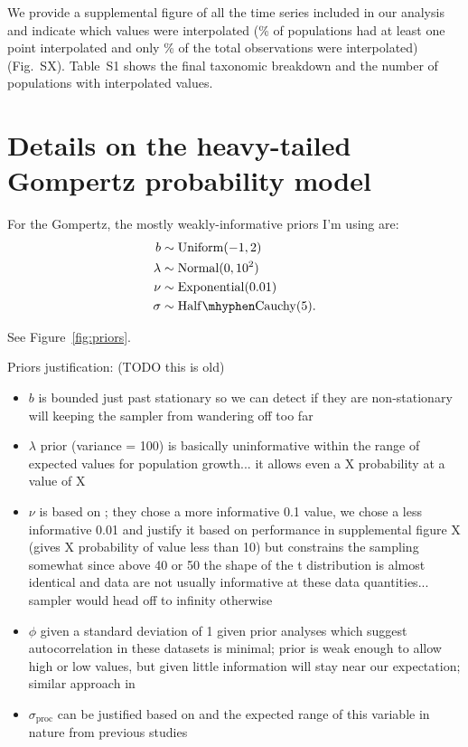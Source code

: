 \documentclass[11pt]{article}
\begin{document}
We provide a supplemental figure of all the time series included in our analysis and indicate which values were interpolated (\percImputedPops\% of populations had at least one point interpolated and only \percImputedPoints\% of the total observations were interpolated) (Fig.\ SX). Table~S1 shows the final taxonomic breakdown and the number of populations with interpolated values.

\section{Details on the heavy-tailed Gompertz probability model}

For the Gompertz, the mostly weakly-informative priors I'm using are:
\begin{align*}
b &\sim \mathrm{Uniform}(-1, 2)\\
\lambda &\sim \mathrm{Normal}(0, 10^2)\\
\nu &\sim \mathrm{Exponential}(0.01)\\
\sigma &\sim \mathrm{Half\mhyphen Cauchy} (5).
\end{align*}

See Figure~\ref{fig:priors}.

Priors justification: (TODO this is old)

\begin{itemize}
\item $b$ is bounded just past stationary so we can detect if they are non-stationary will keeping the sampler from wandering off too far

\item $\lambda$ prior (variance = 100) is basically uninformative within the range of expected values for population growth... it allows even a X probability at a value of X

\item $\nu$ is based on \citet{fernandez1998}; they chose a more informative 0.1 value, we chose a less informative 0.01 and justify it based on performance in supplemental figure X (gives X probability of value less than 10) but constrains the sampling somewhat since above 40 or 50 the shape of the t distribution is almost identical and data are not usually informative at these data quantities... sampler would head off to infinity otherwise

\item $\phi$ given a standard deviation of 1 given prior analyses which suggest autocorrelation in these datasets is minimal; prior is weak enough to allow high or low values, but given little information will stay near our expectation; similar approach in \citep{thorson2014a}

\item $\sigma_\mathrm{proc}$ can be justified based on \citet{gelman2006c} and the expected range of this variable in nature from previous studies \citep[e.g.][]{connors2014}
\end{itemize}
\end{document}
